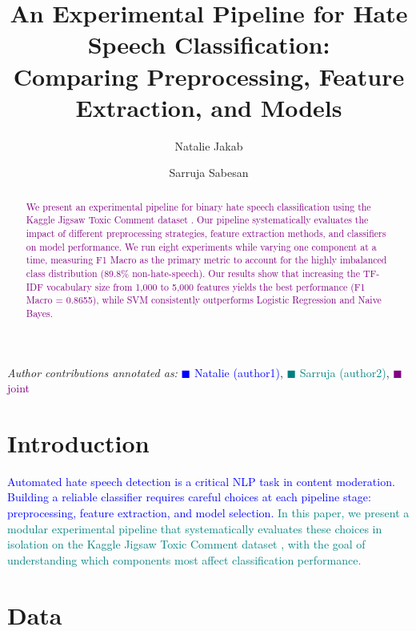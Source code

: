 \documentclass[11pt,a4paper,twocolumn]{article}
\title{\textbf{An Experimental Pipeline for Hate Speech Classification:\\
Comparing Preprocessing, Feature Extraction, and Models}}
\author[1]{Natalie Jakab}
\author[2]{Sarruja Sabesan}
\affil[1,2]{School of Engineering, ZHAW -- Zurich University of Applied Sciences}
\affil[1]{\texttt{[author1 email]}}
\affil[2]{\texttt{[author2 email]}}
\date{}
\newcommand{\authorone}[1]{\textcolor{blue}{#1}}      %
\newcommand{\authortwo}[1]{\textcolor{teal}{#1}}      %
\newcommand{\joint}[1]{\textcolor{purple}{#1}}        %
\begin{document}
\maketitle

\begin{center}
\small
\textit{Author contributions annotated as:}
\authorone{$\blacksquare$ Natalie (author1)},
\authortwo{$\blacksquare$ Sarruja (author2)},
\joint{$\blacksquare$ joint}
\end{center}
\vspace{-6pt}

\begin{abstract}
\joint{
We present an experimental pipeline for binary hate speech classification
using the Kaggle Jigsaw Toxic Comment dataset \citep{jigsaw2018}.
Our pipeline systematically evaluates the impact of different preprocessing
strategies, feature extraction methods, and classifiers on model performance.
We run eight experiments while varying one component at a time, measuring
F1 Macro as the primary metric to account for the highly imbalanced class
distribution (89.8\% non-hate-speech).
Our results show that increasing the TF-IDF vocabulary size from 1{,}000 to
5{,}000 features yields the best performance (F1 Macro = 0.8655), while SVM
consistently outperforms Logistic Regression and Naive Bayes.
}
\end{abstract}

\section{Introduction}

\authorone{
Automated hate speech detection is a critical NLP task in content moderation.
Building a reliable classifier requires careful choices at each pipeline stage:
preprocessing, feature extraction, and model selection.
}\authortwo{
In this paper, we present a modular experimental pipeline that systematically
evaluates these choices in isolation on the Kaggle Jigsaw Toxic Comment dataset
\citep{jigsaw2018}, with the goal of understanding which components most affect
classification performance.
}

\section{Data}
\end{document}
